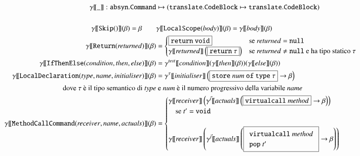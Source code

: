 \begin{figure}[t]
{\scriptsize
\begin{align*}
  \gen{\_}:\mathtt{absyn.Command}&\mapsto(\mathtt{translate.CodeBlock}\mapsto\mathtt{translate.CodeBlock})\\
  \mbox{}\\
  \gen{\mathtt{Skip()}}(\beta)=\beta\qquad&
    \gen{\mathtt{LocalScope(\mathit{body})}}(\beta)=
    \gen{\mathit{body}}(\beta)\\
  \gen{\mathtt{Return(\mathit{returned})}}(\beta)&=
    \begin{cases}
      \fbox{$\mathtt{return\ void}$} &
        \text{se $\mathit{returned}=\mathtt{null}$}\\
      \gen{\mathit{returned}}\left(\fbox{$\mathtt{return\ \tau}$}\right) &
        \text{se $\mathit{returned}\not=\mathtt{null}$ e
              ha tipo statico $\tau$}\\
    \end{cases} \\
  \gen{\mathtt{IfThenElse(\mathit{condition},\mathit{then},\mathit{else})}}
    (\beta)&=\gentest{\mathit{condition}}
      (\gen{\mathit{then}}(\beta))(\gen{\mathit{else}}(\beta))\\
  \gen{\mathtt{LocalDeclaration(\mathit{type},\mathit{name},
     \mathit{initialiser})}}(\beta)&=
       \gentwo{\tau}{\mathit{initialiser}}
        \left(\fbox{$\mathtt{store}\ \mathit{num}\ \mathtt{of\ type}\ \tau$}
        \to\beta\right)\\
  \text{dove $\tau$ \`e il tipo semantico di $\mathit{type}$} &
    \text{ e $\mathit{num}$ \`e il numero progressivo della variabile
    $\mathit{name}$}\\
  \gen{\mathtt{MethodCallCommand(\mathit{receiver},\mathit{name},
    \mathit{actuals})}}(\beta)&=\begin{cases}
    \gen{\mathit{receiver}}\left(\gentwo{\vec{t}}{\mathit{actuals}}
    \left(\fbox{$\mathtt{virtualcall}\ \mathit{method}$}
    \to\beta\right)\right) \\
    \quad\text{se $t'=\mathtt{void}$}\\
    \mbox{}\\
    \gen{\mathit{receiver}}\left(\gentwo{\vec{t}}{\mathit{actuals}}
    \left(\fbox{$\begin{array}{l}
      \mathtt{virtualcall}\ \mathit{method}\\
      \mathtt{pop}\ t'
    \end{array}$}
    \to\beta\right)\right)\\

\end{cases}
\end{align*}}
\end{figure}
